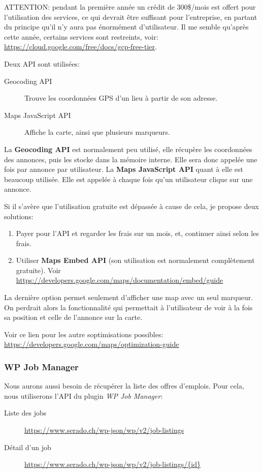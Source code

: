 \documentclass[french]{report}
\begin{document}
ATTENTION: pendant la première année un crédit de 300\$/mois est offert pour
l'utilisation des services, ce qui devrait être suffisant pour l'entreprise, en
partant du principe qu'il n'y aura pas énormément d'utilisateur. Il me semble
qu'après cette année, certains services sont restreints, voir: 
\url{https://cloud.google.com/free/docs/gcp-free-tier}.

Deux API sont utilisées:
\begin{description}
    \item[Geocoding API] Trouve les coordonnées GPS d'un lieu à partir de son adresse.
    \item[Maps JavaScript API] Affiche la carte, ainsi que plusieurs marqueurs.  
\end{description}
\vspace{1em}

La \textbf{Geocoding API} est normalement peu utilisé, elle récupère les
coordonnées des annonces, puis les stocke dans la mémoire interne. Elle sera donc
appelée une fois par annonce par utilisateur. La \textbf{Maps JavaScript API} quant
à elle est beaucoup utilisée. Elle est appelée à chaque fois qu'un utilisateur
clique sur une annonce.

Si il s'avère que l'utilisation gratuite est dépassée à cause de cela, je propose
deux solutions:
\begin{enumerate}
    \item Payer pour l'API et regarder les frais sur un mois, et, continuer ainsi selon les frais.
    \item Utiliser \textbf{Maps Embed API} (son utilisation est normalement complètement gratuite). Voir \url{https://developers.google.com/maps/documentation/embed/guide}
\end{enumerate}
La dernière option permet seulement d'afficher une map avec un seul marqueur. On
perdrait alors la fonctionnalité qui permettait à l'utilisateur de voir à la fois
sa position et celle de l'annonce sur la carte.

Voir ce lien pour les autre soptimisations possibles: \url{https://developers.google.com/maps/optimization-guide}

\subsubsection{WP Job Manager}

Nous aurons aussi besoin de récupérer la liste des offres d'emplois. Pour cela, nous
utiliserons l'API du plugin \textit{WP Job Manager}:
\begin{description}
    \item[Liste des jobs] \url{https://www.serado.ch/wp-json/wp/v2/job-listings}
    \item[Détail d'un job] \url{https://www.serado.ch/wp-json/wp/v2/job-listings/{id}} 
\end{description}
\vspace{1em}
\end{document}
